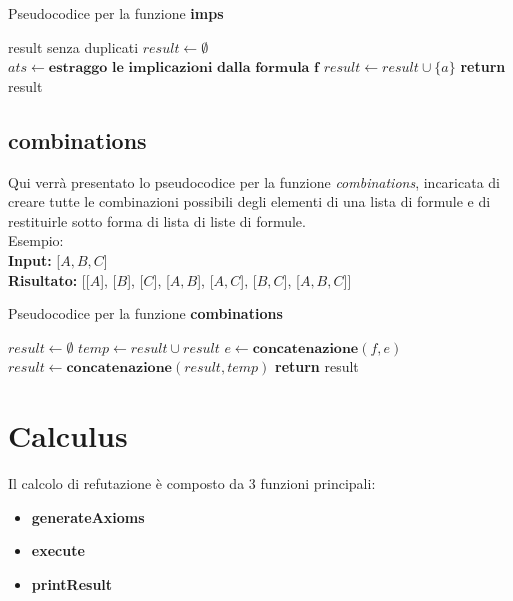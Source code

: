 \documentclass[\main/tesi.tex]{subfiles}
\begin{document}
\begin{algorithm}
    \caption{Pseudocodice per la funzione \textbf{imps}}\label{alg:imps}
    \begin{algorithmic}
        \Ensure result senza duplicati
        \State $result \gets \emptyset$
        \State $ats \gets \textbf{estraggo le implicazioni dalla formula f}$
        \State $result \gets result \cup \{a\}$
        \EndIf
        \EndFor
        \EndFor
        \State \textbf{return} result
        \EndFunction
    \end{algorithmic}
\end{algorithm}

\subsection{combinations}
Qui verrà presentato lo pseudocodice per la funzione \textit{combinations}, incaricata di creare tutte le combinazioni possibili degli elementi di una lista di formule e di restituirle sotto forma di lista di liste di formule. \\
Esempio: \\
\textbf{Input:} [$A, B, C$] \\
\textbf{Risultato:} [[$A$], [$B$], [$C$], [$A, B$], [$A, C$], [$B, C$], [$A, B, C$]]

\begin{algorithm}
    \caption{Pseudocodice per la funzione \textbf{combinations}}\label{alg:combinations}
    \begin{algorithmic}
        \State $result \gets \emptyset$
        \State $temp \gets result \cup result$
        \State $e \gets \textbf{concatenazione}(f, e)$
        \EndFor
        \State $result \gets \textbf{concatenazione}(result, temp)$
        \EndFor
        \State \textbf{return} result
        \EndFunction
    \end{algorithmic}
\end{algorithm}

\section{Calculus}
Il calcolo di refutazione è composto da 3 funzioni principali:
\begin{itemize}
    \item \textbf{generateAxioms}
    \item \textbf{execute}
    \item \textbf{printResult}
\end{itemize}
\end{document}
